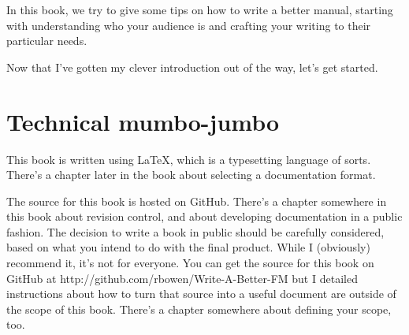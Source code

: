 In this book, we try to give some tips on how to write a better manual,
starting with understanding who your audience is and crafting your
writing to their particular needs.

Now that I've gotten my clever introduction out of the way, let's get
started.

\section{Technical mumbo-jumbo}

This book is written using LaTeX, which is a typesetting language of
sorts. There's a chapter later in the book about selecting a
documentation format.

The source for this book is hosted on GitHub. There's a chapter
somewhere in this book about revision control, and about developing
documentation in a public fashion. The decision to write a book in
public should be carefully considered, based on what you intend to do
with the final product. While I (obviously) recommend it, it's not for
everyone. You can get the source for this book on GitHub at
http://github.com/rbowen/Write-A-Better-FM but I detailed instructions
about how to turn that source into a useful document are outside of the
scope of this book. There's a chapter somewhere about defining your
scope, too.

